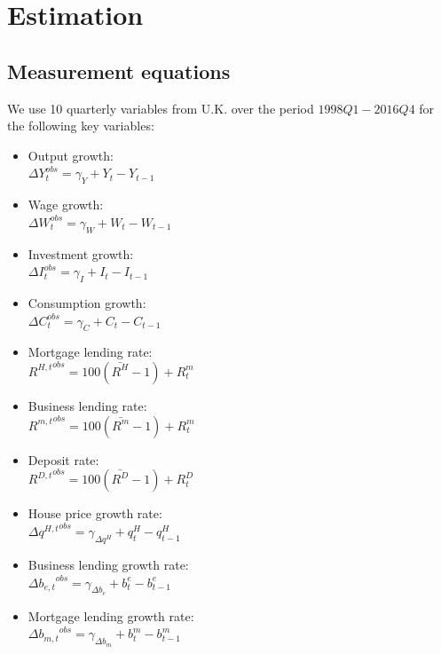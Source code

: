 \documentclass[12pt]{article}
\numberwithin{equation}{section}
\begin{document}
\section*{Estimation}



\subsection*{Measurement equations} 

We use 10 quarterly variables from U.K. over the period $1998Q1-2016Q4$ for the following key variables: 

\begin{itemize}
\item Output growth:\\
$\Delta Y_t^{obs}=\gamma_Y+ Y_t-Y_{t-1}$

\item Wage growth:\\
$\Delta W_t^{obs}=\gamma_W+ W_t-W_{t-1}$

\item Investment growth:\\
$\Delta I_t^{obs}=\gamma_I+ I_t-I_{t-1}$

\item Consumption growth:\\
$\Delta C_t^{obs}=\gamma_C+ C_t-C_{t-1}$

\item Mortgage lending rate:\\
${R^{H,t}}^{obs}=100(\bar{R^H}-1) + R^m_t$
\item Business lending rate:\\
${R^{m,t}}^{obs}=100(\bar{R^m}-1) + R^m_t$

\item Deposit rate: \\
${R^{D,t}}^{obs}=100(\bar{R^D}-1) + R^D_t$


\item House price growth rate: \\
$\Delta {q^{H,t}}^{obs} =\gamma_{\Delta q^H} + q^H_t - q^H_{t-1}$
\item Business lending growth rate:\\
$\Delta {b_{e,t}}^{obs}=\gamma_{\Delta b_e}+  b^e_t - b^e_{t-1} $

\item Mortgage lending growth rate:\\
$\Delta {b_{m,t}}^{obs}=\gamma_{\Delta b_m}+  b^m_t - b^m_{t-1} $

\end{itemize}
\end{document}

